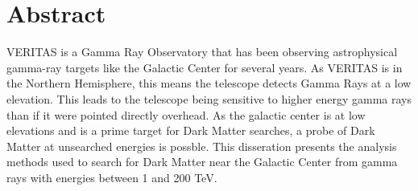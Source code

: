 \cleartooddpage[\thispagestyle{empty}]
\section*{Abstract}

VERITAS is a Gamma Ray Observatory that has been observing astrophysical gamma-ray targets like the Galactic Center for several years.
As VERITAS is in the Northern Hemisphere, this means the telescope detects Gamma Rays at a low elevation.
This leads to the telescope being sensitive to higher energy gamma rays than if it were pointed directly overhead.
As the galactic center is at low elevations and is a prime target for Dark Matter searches, a probe of Dark Matter at unsearched energies is possble.
This disseration presents the analysis methods used to search for Dark Matter near the Galactic Center from gamma rays with energies between 1 and 200 TeV.



\cleartoevenpage[\thispagestyle{plain}]
\null
